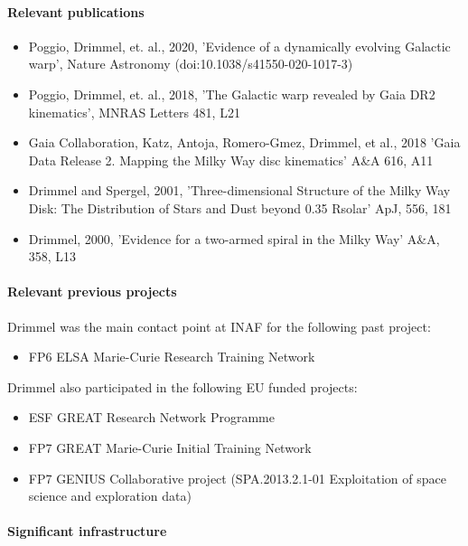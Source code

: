 \paragraph{Relevant publications}
\begin{itemize}
    \item Poggio, Drimmel, et. al., 2020, 'Evidence of a dynamically evolving Galactic warp', Nature Astronomy (doi:10.1038/s41550-020-1017-3)
    \item Poggio, Drimmel, et. al., 2018, 'The Galactic warp revealed by Gaia DR2 kinematics', MNRAS Letters 481, L21
    \item  Gaia Collaboration, Katz, Antoja, Romero-Gmez, Drimmel, et al., 2018 'Gaia Data Release 2. Mapping the Milky Way disc kinematics' A\&A 616, A11
    \item Drimmel and Spergel, 2001, 'Three-dimensional Structure of the Milky Way Disk: The Distribution of Stars and Dust beyond 0.35 Rsolar' ApJ, 556, 181
    \item Drimmel, 2000, 'Evidence for a two-armed spiral in the Milky Way' A\&A, 358, L13
\end{itemize}

\paragraph{Relevant previous projects}

Drimmel was the main contact point at INAF for the following past project:
\begin{itemize}
    \item FP6 ELSA Marie-Curie Research Training Network
\end{itemize}
Drimmel also participated in the following EU funded projects: 
\begin{itemize}
    \item ESF GREAT Research Network Programme 
    \item FP7 GREAT Marie-Curie Initial Training Network
    \item FP7 GENIUS Collaborative project (SPA.2013.2.1-01 Exploitation of space science and exploration data)
\end{itemize}


\paragraph{Significant infrastructure}